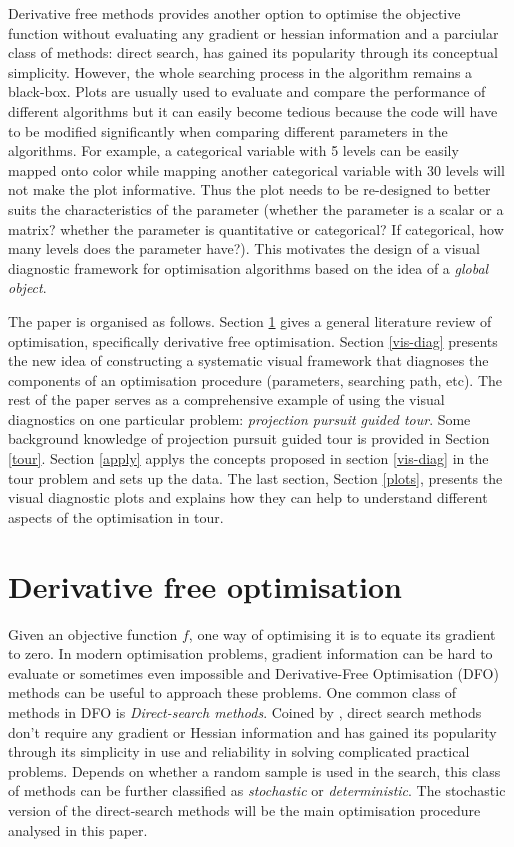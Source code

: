 \documentclass[12pt]{article}
\begin{document}
Derivative free methods provides another option to optimise the
objective function without evaluating any gradient or hessian
information and a parciular class of methods: direct search, has gained
its popularity through its conceptual simplicity. However, the whole
searching process in the algorithm remains a black-box. Plots are
usually used to evaluate and compare the performance of different
algorithms but it can easily become tedious because the code will have
to be modified significantly when comparing different parameters in the
algorithms. For example, a categorical variable with 5 levels can be
easily mapped onto color while mapping another categorical variable with
30 levels will not make the plot informative. Thus the plot needs to be
re-designed to better suits the characteristics of the parameter
(whether the parameter is a scalar or a matrix? whether the parameter is
quantitative or categorical? If categorical, how many levels does the
parameter have?). This motivates the design of a visual diagnostic
framework for optimisation algorithms based on the idea of a
\emph{global object}.

The paper is organised as follows. Section \ref{DFO} gives a general
literature review of optimisation, specifically derivative free
optimisation. Section \ref{vis-diag} presents the new idea of
constructing a systematic visual framework that diagnoses the components
of an optimisation procedure (parameters, searching path, etc). The rest
of the paper serves as a comprehensive example of using the visual
diagnostics on one particular problem: \emph{projection pursuit guided
tour}. Some background knowledge of projection pursuit guided tour is
provided in Section \ref{tour}. Section \ref{apply} applys the concepts
proposed in section \ref{vis-diag} in the tour problem and sets up the
data. The last section, Section \ref{plots}, presents the visual
diagnostic plots and explains how they can help to understand different
aspects of the optimisation in tour.

\hypertarget{DFO}{%
\section{Derivative free optimisation}\label{DFO}}

Given an objective function \(f\), one way of optimising it is to equate
its gradient to zero. In modern optimisation problems, gradient
information can be hard to evaluate or sometimes even impossible and
Derivative-Free Optimisation (DFO) methods can be useful to approach
these problems. One common class of methods in DFO is
\emph{Direct-search methods}. Coined by \citet{hooke1961direct}, direct
search methods don't require any gradient or Hessian information and has
gained its popularity through its simplicity in use and reliability in
solving complicated practical problems. Depends on whether a random
sample is used in the search, this class of methods can be further
classified as \emph{stochastic} or \emph{deterministic}. The stochastic
version of the direct-search methods will be the main optimisation
procedure analysed in this paper.
\end{document}
